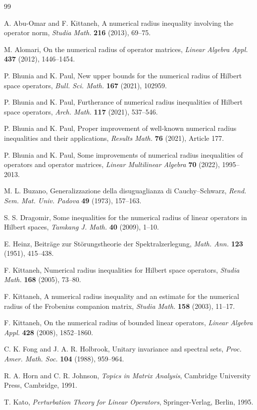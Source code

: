 \documentclass[final,1p,times]{elsarticle}
\begin{document}
\begin{thebibliography}{99}

A. Abu-Omar and F. Kittaneh,
A numerical radius inequality involving the operator norm,
\emph{Studia Math.} \textbf{216} (2013), 69--75.

M. Alomari,
On the numerical radius of operator matrices,
\emph{Linear Algebra Appl.} \textbf{437} (2012), 1446--1454.

P. Bhunia and K. Paul,
New upper bounds for the numerical radius of Hilbert space operators,
\emph{Bull. Sci. Math.} \textbf{167} (2021), 102959.

P. Bhunia and K. Paul,
Furtherance of numerical radius inequalities of Hilbert space operators,
\emph{Arch. Math.} \textbf{117} (2021), 537--546.

P. Bhunia and K. Paul,
Proper improvement of well-known numerical radius inequalities and their applications,
\emph{Results Math.} \textbf{76} (2021), Article 177.

P. Bhunia and K. Paul,
Some improvements of numerical radius inequalities of operators and operator matrices,
\emph{Linear Multilinear Algebra} \textbf{70} (2022), 1995--2013.

M. L. Buzano,
Generalizzazione della disuguaglianza di Cauchy--Schwarz,
\emph{Rend. Sem. Mat. Univ. Padova} \textbf{49} (1973), 157--163.

S. S. Dragomir,
Some inequalities for the numerical radius of linear operators in Hilbert spaces,
\emph{Tamkang J. Math.} \textbf{40} (2009), 1--10.

E. Heinz,
Beiträge zur Störungstheorie der Spektralzerlegung,
\emph{Math. Ann.} \textbf{123} (1951), 415--438.

F. Kittaneh,
Numerical radius inequalities for Hilbert space operators,
\emph{Studia Math.} \textbf{168} (2005), 73--80.

F. Kittaneh,
A numerical radius inequality and an estimate for the numerical radius of the Frobenius companion matrix,
\emph{Studia Math.} \textbf{158} (2003), 11--17.

F. Kittaneh,
On the numerical radius of bounded linear operators,
\emph{Linear Algebra Appl.} \textbf{428} (2008), 1852--1860.

C. K. Fong and J. A. R. Holbrook,
Unitary invariance and spectral sets,
\emph{Proc. Amer. Math. Soc.} \textbf{104} (1988), 959--964.

R. A. Horn and C. R. Johnson,
\emph{Topics in Matrix Analysis},
Cambridge University Press, Cambridge, 1991.

T. Kato,
\emph{Perturbation Theory for Linear Operators},
Springer-Verlag, Berlin, 1995.



\end{thebibliography}
\end{document}
